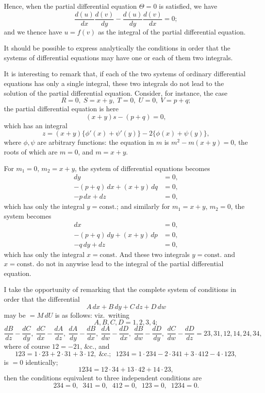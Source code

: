 \documentclass[11pt]{article}
\begin{document}
Hence, when the partial differential equation $\Theta = 0$ is satisfied, we have
\[ \frac{d(u)}{dx}\frac{d(v)}{dy} - \frac{d(u)}{dy}\frac{d(v)}{dx} = 0; \]
and we thence have $u = f(v)$ as the integral of the partial differential equation.

It should be possible to express analytically the conditions in order that the systems of differential equations may have one or each of them two integrals.

It is interesting to remark that, if each of the two systems of ordinary differential equations has only a single integral, these two integrals do not lead to the solution of the partial differential equation. Consider, for instance, the case
\[ R = 0,\; S = x + y,\; T = 0,\; U = 0,\; V = p + q; \]
the partial differential equation is here
\[ (x + y)s - (p + q) = 0, \]
which has an integral
\[ z = (x + y)\{\phi'(x) + \psi'(y)\} - 2\{\phi(x) + \psi(y)\}, \]
where $\phi, \psi$ are arbitrary functions: the equation in $m$ is $m^2 - m(x+y) = 0$, the roots of which are $m = 0$, and $m = x + y$.

For $m_1 = 0$, $m_2 = x + y$, the system of differential equations becomes
\begin{align*}
dy &= 0,\\
-(p+q)\,dx + (x+y)\,dq &= 0,\\
-p\,dx + dz &= 0,
\end{align*}
which has only the integral $y = \text{const.}$; and similarly for $m_1 = x + y$, $m_2 = 0$, the system becomes
\begin{align*}
dx &= 0,\\
-(p+q)\,dy + (x+y)\,dp &= 0,\\
-q\,dy + dz &= 0,
\end{align*}
which has only the integral $x = \text{const.}$ And these two integrals $y = \text{const.}$ and $x = \text{const.}$ do not in anywise lead to the integral of the partial differential equation.

\medskip
I take the opportunity of remarking that the complete system of conditions in order that the differential
\[ A\,dx + B\,dy + C\,dz + D\,dw \]
may be $= M\,dU$ is as follows: viz.\ writing
\[ A, B, C, D = 1, 2, 3, 4; \]
\[ \frac{dB}{dz} - \frac{dC}{dy},\; \frac{dC}{dx} - \frac{dA}{dz},\; \frac{dA}{dy} - \frac{dB}{dx},\; \frac{dA}{dw} - \frac{dD}{dx},\; \frac{dB}{dw} - \frac{dD}{dy},\; \frac{dC}{dw} - \frac{dD}{dz} = 23, 31, 12, 14, 24, 34, \]
where of course $12 = -21$, \&c., and
\[ 123 = 1\cdot 23 + 2\cdot 31 + 3\cdot 12,\;\text{\&c.};\;\; 1234 = 1\cdot 234 - 2\cdot 341 + 3\cdot 412 - 4\cdot 123, \]
is $=0$ identically;
\[ 1234 = 12\cdot 34 + 13\cdot 42 + 14\cdot 23, \]
then the conditions equivalent to three independent conditions are
\[ 234 = 0,\;\; 341 = 0,\;\; 412 = 0,\;\; 123 = 0,\;\; 1234 = 0. \]
\end{document}
